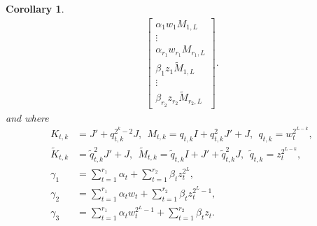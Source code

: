 \documentclass[a4paper]{article}
\newtheorem{corollary}{Corollary}[section]
\newcommand{\LL}{L}
\newcommand{\KK}{K}
\newcommand{\KKother}{\widetilde{K}}
\newcommand{\MM}{M}
\newcommand{\MMother}{\widetilde{M}}
\newcommand{\qq}{\widetilde{q}}
\begin{document}
\begin{corollary}
\[\begin{split}
\begin{bmatrix}
        \alpha_1 w_1 \MM_{1,\LL}\\
        \vdots \\
        \alpha_{r_1} w_{r_1} \MM_{r_1,\LL} \\
        \beta_{1} z_{1} \MMother_{1,\LL}\\
        \vdots \\
        \beta_{r_2} z_{r_2} \MMother_{r_2,\LL}
    \end{bmatrix}.
    \end{split}
    \]
    and where 
    \begin{align*}
        \KK_{t,k} 
        &=
        J' + q_{t,k}^{2^{k}-2} J,~~
        \MM_{t,k} = q_{t,k}I + q_{t,k}^2 J' + J,~~
        q_{t,k} = w_t^{2^{\LL-k}},\\
        \KKother_{t,k} 
        &=
        \qq_{t,k}^2 J' + J,~~
        \MMother_{t,k} = \qq_{t,k} I + J' + \qq_{t,k}^{2} J,~~
        \qq_{t,k} = z_t^{2^{\LL-k}},\\
        \gamma_1 
        &=
        \sum_{t=1}^{r_1} \alpha_t + \sum_{t=1}^{r_2} \beta_t z_t^{2^\LL}, \\
        \gamma_2
        &=
        \sum_{t=1}^{r_1} \alpha_t w_{t}
        +
        \sum_{t=1}^{r_2} \beta_t z_t^{2^{\LL}-1}, \\
        \gamma_3 
        &=
        \sum_{t=1}^{r_1} \alpha_t w_{t}^{2^{\LL}-1} 
        +
        \sum_{t=1}^{r_2} \beta_t z_t.
    \end{align*}
\end{corollary}
\end{document}
